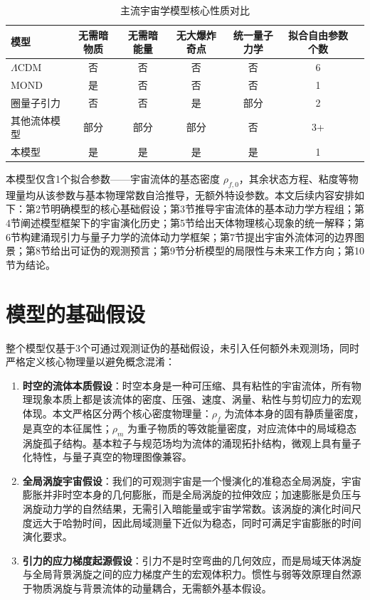 \documentclass[aps,prd,preprint,superscriptaddress,floatfix,numbers,sort&compress]{revtex4-2}
\begin{document}
\begin{table}[h]
\centering
\caption{主流宇宙学模型核心性质对比}
\begin{tabular}{lcccccc}
\hline
模型 & 无需暗物质 & 无需暗能量 & 无大爆炸奇点 & 统一量子力学 & 拟合自由参数个数 \\
\hline
$\Lambda$CDM & 否 & 否 & 否 & 否 & 6 \\
MOND & 是 & 否 & 否 & 否 & 1 \\
圈量子引力 & 否 & 否 & 是 & 部分 & 2 \\
其他流体模型 & 部分 & 部分 & 部分 & 否 & 3+ \\
本模型 & 是 & 是 & 是 & 是 & 1 \\
\hline
\end{tabular}
\label{tab:model_compare}
\end{table}

本模型仅含1个拟合参数——宇宙流体的基态密度 $\rho_{f,0}$，其余状态方程、粘度等物理量均从该参数与基本物理常数自洽推导，无额外特设参数。本文后续内容安排如下：第2节明确模型的核心基础假设；第3节推导宇宙流体的基本动力学方程组；第4节阐述模型框架下的宇宙演化历史；第5节给出天体物理核心现象的统一解释；第6节构建涌现引力与量子力学的流体动力学框架；第7节提出宇宙外流体河的边界图景；第8节给出可证伪的观测预言；第9节分析模型的局限性与未来工作方向；第10节为结论。

\section{模型的基础假设}
整个模型仅基于3个可通过观测证伪的基础假设，未引入任何额外未观测场，同时严格定义核心物理量以避免概念混淆：
\begin{enumerate}
    \item \textbf{时空的流体本质假设}：时空本身是一种可压缩、具有粘性的宇宙流体，所有物理现象本质上都是该流体的密度、压强、速度、涡量、粘性与剪切应力的宏观体现。本文严格区分两个核心密度物理量：$\rho_{f}$ 为流体本身的固有静质量密度，是真空的本征属性；$\rho_{m}$ 为重子物质的等效能量密度，对应流体中的局域稳态涡旋孤子结构。基本粒子与规范场均为流体的涌现拓扑结构，微观上具有量子化特性，与量子真空的物理图像兼容。
    \item \textbf{全局涡旋宇宙假设}：我们的可观测宇宙是一个慢演化的准稳态全局涡旋，宇宙膨胀并非时空本身的几何膨胀，而是全局涡旋的拉伸效应；加速膨胀是负压与涡旋动力学的自然结果，无需引入暗能量或宇宙学常数。该涡旋的演化时间尺度远大于哈勃时间，因此局域测量下近似为稳态，同时可满足宇宙膨胀的时间演化要求。
    \item \textbf{引力的应力梯度起源假设}：引力不是时空弯曲的几何效应，而是局域天体涡旋与全局背景涡旋之间的应力梯度产生的宏观体积力。惯性与弱等效原理自然源于物质涡旋与背景流体的动量耦合，无需额外基本假设。
\end{enumerate}
\end{document}
